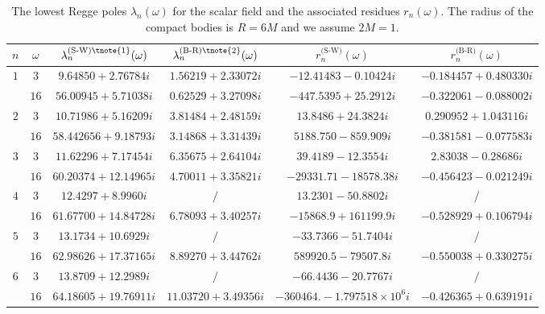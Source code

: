 \documentclass[aps,prd,longbibliography,reprint,twocolumn,amsmath,amssymb,amsfonts,showpacs,superscriptaddress]{revtex4-1}%
\begin{document}
\begingroup
\squeezetable
\begin{table}[htp]
\begin{threeparttable}[htp]
\caption{\label{tab:table2} The lowest Regge poles $\lambda_{n}(\omega)$ for the scalar field and the associated residues $r_{n}(\omega)$. The radius of the compact bodies is $R = 6M$ and we assume $2M=1$.}
\smallskip
\centering
\begin{ruledtabular}
\begin{tabular}{cccccc}
 $n$ & $\omega$  & $\lambda^{\text{(S-W)\tnote{1}}}_n(\omega)$ & $\lambda^{\text{(B-R)\tnote{2}}}_n(\omega)$ & $r^{\text{(S-W)}}_{n}(\omega)$ & $r^{\text{(B-R)}}_{n}(\omega)$
 \\ \hline
$1$  & $3$  & $ 9.64850+2.76784 i$  & $1.56219+2.33072 i$  & $-12.41483-0.10424 i$  & $ -0.184457+0.480330 i$    \\
     & $16$  & $56.00945+5.71038 i$  & $ 0.62529+3.27098 i$  & $-447.5395+25.2912 i$  & $-0.322061-0.088002 i $  \\

$2$  & $3$  & $ 10.71986+5.16209 i $  & $3.81484+2.48159 i$  & $13.8486+24.3824 i$  & $0.290952+1.043116 i$    \\
     & $16$  & $ 58.442656+9.18793 i$  & $3.14868+3.31439 i$  & $5188.750-859.909 i$  & $ -0.381581-0.077583 i$    \\

$3$  & $3$  & $11.62296+7.17454 i$  & $ 6.35675+2.64104 i$  & $39.4189-12.3554 i$ & $2.83038-0.28686 i$    \\
     & $16$  & $60.20374+12.14965 i$  & $4.70011+3.35821 i$  & $-29331.71-18578.38 i$  & $-0.456423-0.021249 i$ \\

$4$  & $3$  & $ 12.4297+8.9960 i$  & $/$  & $ 13.2301-50.8802 i$ & $/$    \\
     & $16$  & $ 61.67700+14.84728 i $  & $6.78093+3.40257 i$  & $-15868.9+161199.9 i$  & $-0.528929+0.106794 i$ \\

$5$  & $3$  & $13.1734+10.6929 i$  & $/$  & $-33.7366-51.7404 i$ & $/$     \\
     & $16$  & $62.98626+17.37165 i$  & $8.89270+3.44762 i$  & $589920.5-79507.8 i$  & $-0.550038+0.330275 i$    \\

$6$  & $3$  & $13.8709+12.2989 i$  & $/$   & $-66.4436-20.7767 i$ & $/$    \\
     & $16$  & $ 64.18605+19.76911 i$  & $11.03720+3.49356 i$  & $-360464.-1.797518\times 10^6 i$  & $ -0.426365+0.639191 i$    \\


\end{tabular}
\end{ruledtabular}
\end{threeparttable}
\end{table}
\end{document}
